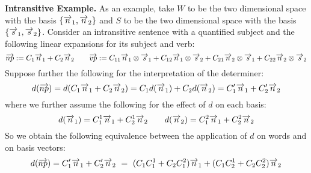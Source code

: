 \noindent
{\bf Intransitive Example.} 
As an example, take $W$ to be the two dimensional space with the basis $\{\overrightarrow{n}_1, \overrightarrow{n}_2\}$ and $S$ to be the two dimensional space with the basis $\{\overrightarrow{s}_1, \overrightarrow{s}_2\}$.  Consider an intransitive sentence with a quantified subject and the following linear expansions for its subject and verb:
\[
\overrightarrow{np} := C_1 \overrightarrow{n}_1 + C_2 \overrightarrow{n}_2
\qquad 
 \overrightarrow{vp} := C_{11} \overrightarrow{n}_1 \otimes \overrightarrow{s}_1 + C_{12} \overrightarrow{n}_1 \otimes \overrightarrow{s}_2 +  C_{21}  \overrightarrow{n}_2 \otimes \overrightarrow{s}_1 + C_{22} \overrightarrow{n}_2 \otimes \overrightarrow{s}_2
 \]
    Suppose further the following for the interpretation of the determiner:
 \begin{equation*}\label{eqDetLin}
d(\overrightarrow{{np}}) = d(C_1 \overrightarrow{n}_1 + C_2 \overrightarrow{n}_2) =  C_1 d(\overrightarrow{n}_1) + C_2 d(\overrightarrow{n}_2) =  C'_1 \overrightarrow{n}_1 + C'_2 \overrightarrow{n}_2
\end{equation*}
where we further assume the following for the effect of $d$ on each basis:
\[
d(\overrightarrow{n}_1) = C^1_1 \overrightarrow{n}_1 + C^1_2 \overrightarrow{n}_2 \qquad
d(\overrightarrow{n}_2) = C^2_1 \overrightarrow{n}_1 + C^2_2 \overrightarrow{n}_2 
\]
So we obtain the following equivalence between the application of $d$ on words and on basis vectors:
\[
d(\overrightarrow{{np}}) = C'_1 \overrightarrow{n}_1 + C'_2 \overrightarrow{n}_2 \ = \ (C_1 C_1^1 + C_2 C_1^2) \overrightarrow{n}_1 + (C_1C_2^1 + C_2C_2^2) \overrightarrow{n}_2
\]

